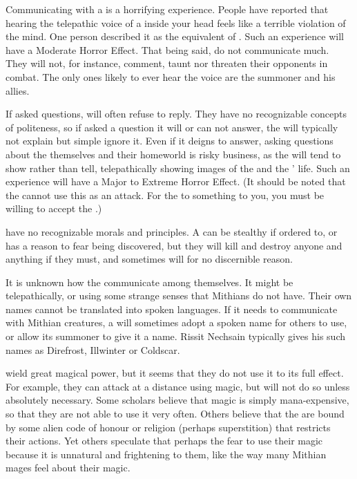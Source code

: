 Communicating with a \bane{} is a horrifying experience. People have reported that hearing the telepathic voice of a \bane{} inside your head feels like a terrible violation of the mind. One person described it as the equivalent of . Such an experience will have a Moderate Horror Effect. That being said, \banes{} do not communicate much. They will not, for instance, comment, taunt nor threaten their opponents in combat. The only ones likely to ever hear the \banez{} voice are the summoner and his allies. 

If asked questions, \banes{} will often refuse to reply. They have no recognizable concepts of politeness, so if asked a question it will or can not answer, the \bane{} will typically not explain but simple ignore it. Even if it deigns to answer, asking questions about the \banes{} themselves and their homeworld is risky business, as the \bane{} will tend to show rather than tell, telepathically showing images of the \baneworld{} and the \banes{}' life. Such an experience will have a Major to Extreme Horror Effect. (It should be noted that the \bane{} cannot use this as an attack. For the \bane{} to  something to you, you must be willing to accept the .) 

\Banes{} have no recognizable morals and principles. A \bane{} can be stealthy if ordered to, or has a reason to fear being discovered, but they will kill and destroy anyone and anything if they must, and sometimes will for no discernible reason. 

It is unknown how the \banes{} communicate among themselves. It might be telepathically, or using some strange senses that Mithians do not have. Their own names cannot be translated into spoken languages. If it needs to communicate with Mithian creatures, a \bane{} will sometimes adopt a spoken name for others to use, or allow its summoner to give it a name. Rissit Nechsain typically gives his \banes{} such names as Direfrost, Illwinter or Coldscar. 

\Banes{} wield great magical power, but it seems that they do not use it to its full effect. For example, they can attack at a distance using magic, but will not do so unless absolutely necessary. Some scholars believe that \bane{} magic is simply mana-expensive, so that they are not able to use it very often. Others believe that the \banes{} are bound by some alien code of honour or religion (perhaps superstition) that restricts their actions. Yet others speculate that perhaps the \banes{} fear to use their magic because it is unnatural and frightening to them, like the way many Mithian mages feel about their magic. 

